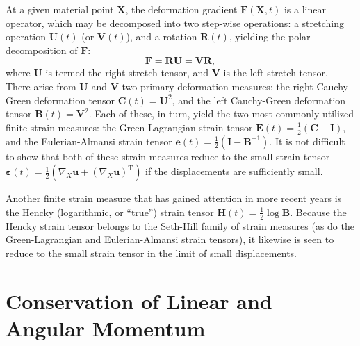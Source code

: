 At a given material point $\bm{X}$, the deformation gradient $\bm{F} (\bm{X}, t)$ is a linear operator, which may be decomposed into two step-wise operations: a stretching operation $\bm{U}(t)$ (or $\bm{V}(t)$), and a rotation $\bm{R}(t)$, yielding the polar decomposition of $\bm{F}$:
\begin{equation}
  \bm{F} = \bm{R} \bm{U} = \bm{V} \bm{R},
\end{equation}
where $\bm{U}$ is termed the right stretch tensor, and $\bm{V}$ is the left stretch tensor. There arise from $\bm{U}$ and $\bm{V}$ two primary deformation measures: the right Cauchy-Green deformation tensor $\bm{C}(t) = \bm{U}^2$, and the left Cauchy-Green deformation tensor $\bm{B}(t) = \bm{V}^2$. Each of these, in turn, yield the two most commonly utilized finite strain measures: the Green-Lagrangian strain tensor $\bm{E}(t) = \frac{1}{2} (\bm{C} - \bm{I})$, and the Eulerian-Almansi strain tensor $\bm{e}(t) = \frac{1}{2} (\bm{I} - \bm{B}^{-1})$. It is not difficult to show that both of these strain measures reduce to the small strain tensor $\boldsymbol{\varepsilon}(t) = \frac{1}{2} (\nabla_X \bm{u} + (\nabla_X \bm{u})^{\mathrm T})$ if the displacements are sufficiently small.

Another finite strain measure that has gained attention in more recent years is the Hencky (logarithmic, or ``true'') strain tensor $\bm{H}(t) = \frac{1}{2} \log \bm{B}$. Because the Hencky strain tensor belongs to the Seth-Hill family of strain measures (as do the Green-Lagrangian and Eulerian-Almansi strain tensors), it likewise is seen to reduce to the small strain tensor in the limit of small displacements.

\section{Conservation of Linear and Angular Momentum}

